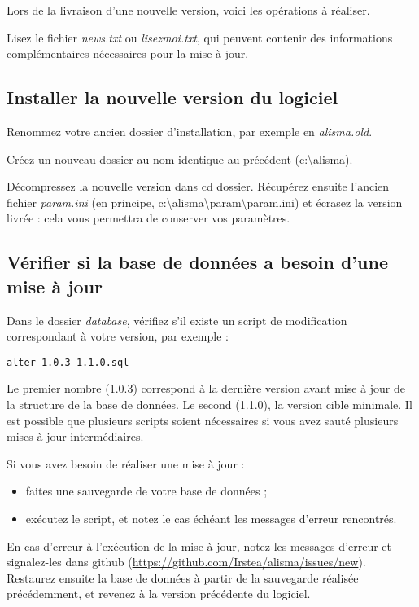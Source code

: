 Lors de la livraison d'une nouvelle version, voici les opérations à réaliser.

Lisez le fichier \textit{news.txt} ou \textit{lisezmoi.txt}, qui peuvent contenir des informations complémentaires nécessaires pour la mise à jour.

\subsection{Installer la nouvelle version du logiciel}

Renommez votre ancien dossier d'installation, par exemple en \textit{alisma.old}.

Créez un nouveau dossier au nom identique au précédent (c:\textbackslash{}alisma).

Décompressez la nouvelle version dans cd dossier. Récupérez ensuite l'ancien fichier \textit{param.ini} (en principe, c:\textbackslash{}alisma\textbackslash{}param\textbackslash{}param.ini) et écrasez la version livrée : cela vous permettra de conserver vos paramètres.

\subsection{Vérifier si la base de données a besoin d'une mise à jour}

Dans le dossier \textit{database}, vérifiez s'il existe un script de modification correspondant à votre version, par exemple :

\begin{lstlisting}
alter-1.0.3-1.1.0.sql
\end{lstlisting}

Le premier nombre (1.0.3) correspond à la dernière version avant mise à jour de la structure de la base de données. Le second (1.1.0), la version cible minimale. Il est possible que plusieurs scripts soient nécessaires si vous avez sauté plusieurs mises à jour intermédiaires.

Si vous avez besoin de réaliser une mise à jour :
\begin{itemize}
\item faites une sauvegarde de votre base de données ;
\item exécutez le script, et notez le cas échéant les messages d'erreur rencontrés.
\end{itemize}

En cas d'erreur à l'exécution de la mise à jour, notez les messages d'erreur et signalez-les dans github (\url{https://github.com/Irstea/alisma/issues/new}).
Restaurez ensuite la base de données à partir de la sauvegarde réalisée précédemment, et revenez à la version précédente du logiciel.

